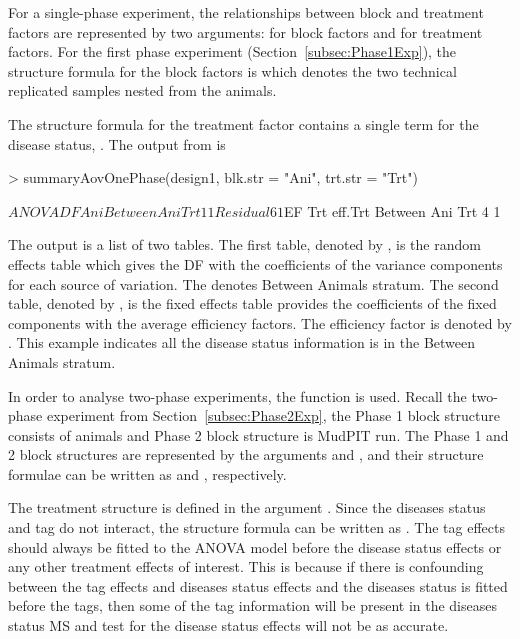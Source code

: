 \documentclass[article]{jss}
\begin{document}
For a single-phase experiment, the relationships between block and treatment factors are represented by two arguments:  for block factors and  for treatment factors. For the first phase experiment (Section~\ref{subsec:Phase1Exp}), the structure formula for the block factors is  which denotes the two technical replicated samples nested from the animals. 

The structure formula for the treatment factor contains a single term for the disease status, . The output from  is 
\begin{CodeChunk}
\begin{CodeInput}
> summaryAovOnePhase(design1, blk.str = "Ani", trt.str = "Trt") 
\end{CodeInput}
\begin{CodeOutput}
$ANOVA
            DF Ani
Between Ani       
   Trt      1  1  
   Residual 6  1  

$EF
            Trt eff.Trt
Between Ani            
   Trt      4   1      
\end{CodeOutput}
\end{CodeChunk}
The output is a list of two tables. The first table, denoted by , is the random effects table which gives the DF with the coefficients of the variance components for each source of variation.   The  denotes Between Animals stratum. The second table, denoted by , is the fixed effects table provides the coefficients of the fixed components with the average efficiency factors. The efficiency factor is denoted by . This example indicates all the disease status information is in the Between Animals stratum.

In order to analyse two-phase experiments, the function  is used. Recall the two-phase experiment from Section~\ref{subsec:Phase2Exp}, the Phase 1 block structure consists of animals  and Phase 2 block structure is MudPIT run. The Phase 1 and 2 block structures are represented by the arguments  and , and their structure formulae can be written as  and , respectively.

The treatment structure is defined in the argument . Since the diseases status and tag do not interact, the structure formula can be written as . The tag effects should always be fitted to the ANOVA model before the disease status effects or any other treatment effects of interest. This is because if there is confounding between the tag effects and diseases status effects and the diseases status is fitted before the tags, then some of the tag information will be present in the diseases status MS and test for the disease status effects will not be as accurate. 
\end{document}
